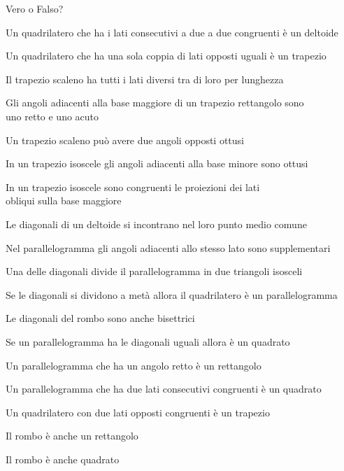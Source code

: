 \begin{esercizio}
\label{ese:4.2}
Vero o Falso?
\begin{enumeratea}
\item Un quadrilatero che ha i lati consecutivi a due a due 
congruenti è un deltoide\hfill\boxV\quad\boxF
\item Un quadrilatero che ha una sola coppia di lati opposti uguali è 
un trapezio\hfill\boxV\quad\boxF
\item Il trapezio scaleno ha tutti i lati diversi tra di loro per 
lunghezza\hfill\boxV\quad\boxF
\item Gli angoli adiacenti alla base maggiore di un trapezio 
rettangolo sono \\
uno retto e uno acuto\hfill\boxV\quad\boxF
\item Un trapezio scaleno può avere due angoli opposti 
ottusi\hfill\boxV\quad\boxF
\item In un trapezio isoscele gli angoli adiacenti alla base minore 
sono ottusi\hfill\boxV\quad\boxF
\item In un trapezio isoscele sono congruenti le proiezioni dei lati \\ 
obliqui sulla base maggiore\hfill\boxV\quad\boxF
\item Le diagonali di un deltoide si incontrano nel loro punto medio 
comune\hfill\boxV\quad\boxF
\item Nel parallelogramma gli angoli adiacenti allo stesso lato sono 
supplementari\hfill\boxV\quad\boxF
\item Una delle diagonali divide il parallelogramma in due triangoli 
isosceli\hfill\boxV\quad\boxF
\item Se le diagonali si dividono a metà allora il quadrilatero è 
un parallelogramma\hfill\boxV\quad\boxF
\item Le diagonali del rombo sono anche 
bisettrici\hfill\boxV\quad\boxF
\item Se un parallelogramma ha le diagonali uguali allora  
è un quadrato\hfill\boxV\quad\boxF
\item Un parallelogramma che ha un angolo retto è un 
rettangolo\hfill\boxV\quad\boxF
\item Un parallelogramma che ha due lati consecutivi congruenti è un 
quadrato\hfill\boxV\quad\boxF
\item Un quadrilatero con due lati opposti congruenti è un 
trapezio\hfill\boxV\quad\boxF
\item Il rombo è anche un rettangolo\hfill\boxV\quad\boxF
\item Il rombo è anche quadrato\hfill\boxV\quad\boxF

\end{enumeratea}
\end{esercizio}
